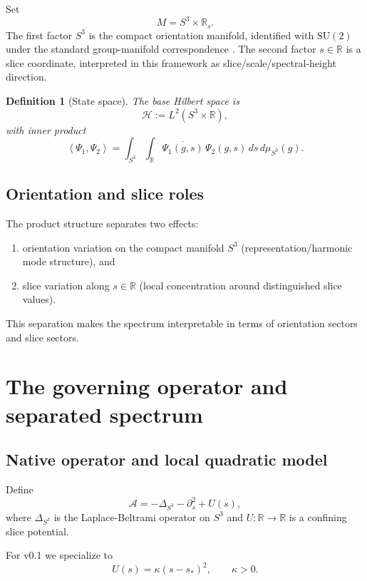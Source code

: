 \documentclass[11pt]{article}
\newtheorem{definition}{Definition}[section]
\theoremstyle{remark}
\newcommand{\R}{\mathbb{R}}
\newcommand{\SU}{\mathrm{SU}}
\newcommand{\Lp}{L^2}
\newcommand{\ip}[2]{\left\langle #1, #2 \right\rangle}
\newcommand{\Aop}{\mathcal{A}}
\begin{document}
Set
\[
M=S^3\times\R_s.
\]
The first factor $S^3$ is the compact orientation manifold, identified with $\SU(2)$ under the standard group-manifold correspondence \citep{hall2015,helgason1984}. The second factor $s\in\R$ is a slice coordinate, interpreted in this framework as slice/scale/spectral-height direction.

\begin{definition}[State space]
The base Hilbert space is
\[
\mathcal{H}:=\Lp(S^3\times\R),
\]
with inner product
\[
\ip{\Psi_1}{\Psi_2}
=
\int_{S^3}\int_{\R}\overline{\Psi_1(g,s)}\,\Psi_2(g,s)\,ds\,d\mu_{S^3}(g).
\]
\end{definition}

\subsection{Orientation and slice roles}

The product structure separates two effects:
\begin{enumerate}
\item orientation variation on the compact manifold $S^3$ (representation/harmonic mode structure), and
\item slice variation along $s\in\R$ (local concentration around distinguished slice values).
\end{enumerate}
This separation makes the spectrum interpretable in terms of orientation sectors and slice sectors.

\section{The governing operator and separated spectrum}

\subsection{Native operator and local quadratic model}

Define
\begin{equation}
\Aop = -\Delta_{S^3} - \partial_s^2 + U(s),
\label{eq:operator-general}
\end{equation}
where $\Delta_{S^3}$ is the Laplace-Beltrami operator on $S^3$ and $U:\R\to\R$ is a confining slice potential.

For v0.1 we specialize to
\begin{equation}
U(s)=\kappa (s-s_*)^2,\qquad \kappa>0.
\label{eq:quadratic-potential}
\end{equation}
\end{document}
